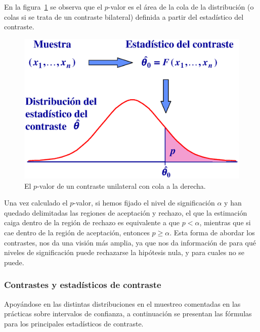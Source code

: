 En la figura~\ref{g:pvalor} se observa que el $p$-valor es el área de la cola
de la distribución (o colas si se trata de un contraste bilateral) definida a
partir del estadístico del contraste.

\begin{figure}[h!]
\begin{center}
\includegraphics[scale=0.5]{contrastes/estadisticocontraste}
\caption{El $p$-valor de un contraste unilateral con cola a la derecha.}
\label{g:pvalor}
\end{center}
\end{figure}

Una vez calculado el $p$-valor, si hemos fijado el nivel de significación
$\alpha$ y han quedado delimitadas las regiones de aceptación y rechazo, el
que la estimación caiga dentro de la región de rechazo es equivalente a que
$p<\alpha$, mientras que si cae dentro de la región de aceptación, entonces
$p\geq \alpha$. Esta forma de abordar los contrastes, nos da una visión más
amplia, ya que nos da información de para qué niveles de significación puede
rechazarse la hipótesis nula, y para cuales no se puede.


\subsubsection{Contrastes y estadísticos de contraste}
Apoyándose en las distintas distribuciones en el muestreo comentadas en las
prácticas sobre intervalos de confianza, a continuación se presentan las
fórmulas para los principales estadísticos de contraste.


